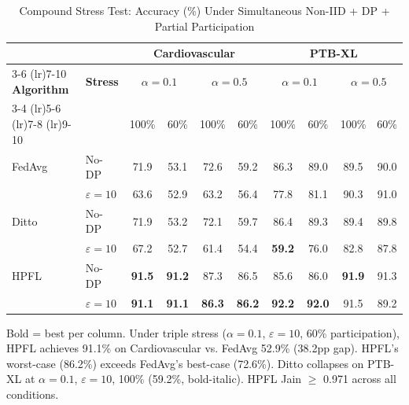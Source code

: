 \documentclass[conference,a4paper]{IEEEtran}
\begin{document}
\begin{table}[htbp]
\centering
\caption{Compound Stress Test: Accuracy (\%) Under Simultaneous Non-IID + DP + Partial Participation}
\label{tab:compound_stress}
\small
\begin{tabular}{llcccccccc}
\toprule
 & & \multicolumn{4}{c}{\textbf{Cardiovascular}} & \multicolumn{4}{c}{\textbf{PTB-XL}} \\
\cmidrule(lr){3-6} \cmidrule(lr){7-10}
\textbf{Algorithm} & \textbf{Stress} & \multicolumn{2}{c}{$\alpha{=}0.1$} & \multicolumn{2}{c}{$\alpha{=}0.5$} & \multicolumn{2}{c}{$\alpha{=}0.1$} & \multicolumn{2}{c}{$\alpha{=}0.5$} \\
\cmidrule(lr){3-4} \cmidrule(lr){5-6} \cmidrule(lr){7-8} \cmidrule(lr){9-10}
 & & 100\% & 60\% & 100\% & 60\% & 100\% & 60\% & 100\% & 60\% \\
\midrule
FedAvg & No-DP & 71.9 & 53.1 & 72.6 & 59.2 & 86.3 & 89.0 & 89.5 & 90.0 \\
 & $\varepsilon{=}10$ & 63.6 & 52.9 & 63.2 & 56.4 & 77.8 & 81.1 & 90.3 & 91.0 \\
\midrule
Ditto & No-DP & 71.9 & 53.2 & 72.1 & 59.7 & 86.4 & 89.3 & 89.4 & 89.8 \\
 & $\varepsilon{=}10$ & 67.2 & 52.7 & 61.4 & 54.4 & \textbf{59.2} & 76.0 & 82.8 & 87.8 \\
\midrule
HPFL & No-DP & \textbf{91.5} & \textbf{91.2} & 87.3 & 86.5 & 85.6 & 86.0 & \textbf{91.9} & 91.3 \\
 & $\varepsilon{=}10$ & \textbf{91.1} & \textbf{91.1} & \textbf{86.3} & \textbf{86.2} & \textbf{92.2} & \textbf{92.0} & 91.5 & 89.2 \\
\bottomrule
\end{tabular}

\vspace{1mm}
\footnotesize{Bold = best per column. Under triple stress ($\alpha{=}0.1$, $\varepsilon{=}10$, 60\% participation), HPFL achieves 91.1\% on Cardiovascular vs. FedAvg 52.9\% (38.2pp gap). HPFL's worst-case (86.2\%) exceeds FedAvg's best-case (72.6\%). Ditto collapses on PTB-XL at $\alpha{=}0.1$, $\varepsilon{=}10$, 100\% (59.2\%, bold-italic). HPFL Jain $\geq$ 0.971 across all conditions.}
\end{table}
\end{document}
